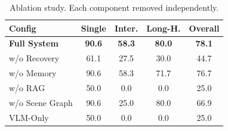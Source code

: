 \begin{table}[t]
\centering
\caption{Ablation study. Each component removed independently.}
\label{tab:ablation}
\setlength{\tabcolsep}{3pt}
\begin{tabular}{@{}lcccc@{}}
\toprule
\textbf{Config} & \textbf{Single} & \textbf{Inter.} & \textbf{Long-H.} & \textbf{Overall} \\
\midrule
\textbf{Full System} & \textbf{90.6} & \textbf{58.3} & \textbf{80.0} & \textbf{78.1} \\
w/o Recovery & 61.1 & 27.5 & 30.0 & 44.7 \\
w/o Memory & 90.6 & 58.3 & 71.7 & 76.7 \\
w/o RAG & 50.0 & 0.0 & 0.0 & 25.0 \\
w/o Scene Graph & 90.6 & 25.0 & 80.0 & 66.9 \\
VLM-Only & 50.0 & 0.0 & 0.0 & 25.0 \\
\bottomrule
\end{tabular}
\end{table}